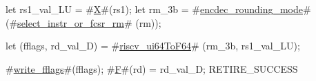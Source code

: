 let rs1_val_LU = #\hyperref[sailRISCVzX]{X}#(rs1);
let rm_3b      = #\hyperref[sailRISCVzencdeczyroundingzymode]{encdec\_rounding\_mode}# (#\hyperref[sailRISCVzselectzyinstrzyorzyfcsrzyrm]{select\_instr\_or\_fcsr\_rm}#  (rm));

let (fflags, rd_val_D) = #\hyperref[sailRISCVzriscvzyui64ToF64]{riscv\_ui64ToF64}# (rm_3b, rs1_val_LU);

#\hyperref[sailRISCVzwritezyfflags]{write\_fflags}#(fflags);
#\hyperref[sailRISCVzF]{F}#(rd) = rd_val_D;
RETIRE_SUCCESS
